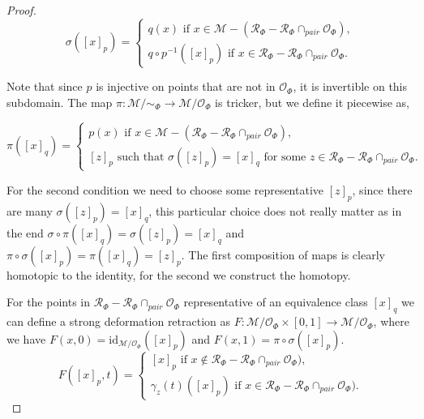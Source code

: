 \documentclass[10pt,a4paper]{amsart}
\begin{document}
\begin{proof}
    \begin{equation*}
        \sigma([x]_p) = 
        \begin{cases}
            q(x) \text{ if } x \in \mathcal{M} - (\mathcal{R}_\Phi-\mathcal{R}_\Phi\cap_{pair}\mathcal{O}_\Phi), \\
            q \circ p^{-1}([x]_p) \text{ if } x \in \mathcal{R}_\Phi-\mathcal{R}_\Phi\cap_{pair}\mathcal{O}_\Phi.
        \end{cases}
    \end{equation*}
    
    Note that since $p$ is injective on points that are not in $\mathcal{O}_\Phi$, it is invertible on this subdomain. The map $\pi: \mathcal{M}/\sim_\Phi \to \mathcal{M}/\mathcal{O}_\Phi$ is tricker, but we define it piecewise as,

    \begin{equation*}
    \pi([x]_q) = 
        \begin{cases}
            p(x) \text{ if } x \in \mathcal{M} - (\mathcal{R}_\Phi-\mathcal{R}_\Phi\cap_{pair}\mathcal{O}_\Phi), \\
            [z]_p \text{ such that } \sigma([z]_p) = [x]_q \text{ for some } z \in \mathcal{R}_\Phi - \mathcal{R}_\Phi\cap_{pair}\mathcal{O}_\Phi.
        \end{cases}
    \end{equation*}

    For the second condition we need to choose some representative $[z]_p$, since there are many $\sigma([z]_p) = [x]_q$, this particular choice does not really matter as in the end $\sigma \circ \pi ([x]_q) = \sigma([z]_p) = [x]_q$ and $\pi \circ \sigma([x]_p) = \pi([x]_q) =  [z]_p$. The first composition of maps is clearly homotopic to the identity, for the second we construct the homotopy.

    For the points in $\mathcal{R}_\Phi- \mathcal{R}_\Phi\cap_{pair}\mathcal{O}_\Phi$ representative of an equivalence class $[x]_q$ we can define a strong deformation retraction as $F:\mathcal{M}/\mathcal{O}_\Phi\times [0,1] \to \mathcal{M}/\mathcal{O}_\Phi$, where we have $F(x,0) = \text{id}_{\mathcal{M}/\mathcal{O}_\Phi}([x]_p)$ and $F(x,1) = \pi \circ \sigma ([x]_p)$. 
    \begin{equation*}
        F([x]_p,t) = 
        \begin{cases}
            [x]_p \text{ if } x\notin \mathcal{R}_\Phi- \mathcal{R}_\Phi\cap_{pair}\mathcal{O}_\Phi),\\
            \gamma_z(t)([x]_p) \text{ if } x \in \mathcal{R}_\Phi- \mathcal{R}_\Phi\cap_{pair}\mathcal{O}_\Phi).
        \end{cases}
    \end{equation*}


\end{proof}
\end{document}
